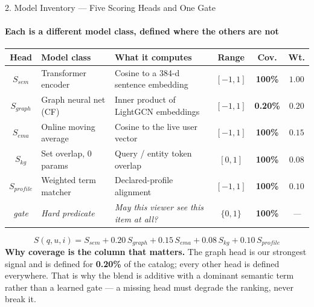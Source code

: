 \begin{frame}[shrink]{2. Model Inventory --- Five Scoring Heads and One Gate}
\framesubtitle{Each is a different model class, defined where the others are not}
\vspace{1mm}
\begin{center}
{\scriptsize
\renewcommand{\arraystretch}{1.22}
\begin{tabular}{c L{2.5cm} L{3.9cm} c c c}
\toprule
\textbf{Head} & \textbf{Model class} & \textbf{What it computes} & \textbf{Range} & \textbf{Cov.} & \textbf{Wt.}\\
\midrule
$S_{\mathit{sem}}$     & Transformer encoder   & Cosine to a 384-d sentence embedding & $[-1,1]$ & \textbf{100\%} & $1.00$\\
$S_{\mathit{graph}}$   & Graph neural net (CF) & Inner product of LightGCN embeddings & $[-1,1]$ & \textcolor{amritaMaroon}{\textbf{0.20\%}} & $0.20$\\
$S_{\mathit{ema}}$     & Online moving average & Cosine to the live user vector       & $[-1,1]$ & \textbf{100\%} & $0.15$\\
$S_{\mathit{kg}}$      & Set overlap, 0 params & Query / entity token overlap         & $[0,1]$  & \textbf{100\%} & $0.08$\\
$S_{\mathit{profile}}$ & Weighted term matcher & Declared-profile alignment           & $[-1,1]$ & \textbf{100\%} & $0.10$\\
\midrule
\textit{gate} & \textit{Hard predicate} & \textit{May this viewer see this item at all?} & $\{0,1\}$ & \textbf{100\%} & \textit{---}\\
\bottomrule
\end{tabular}}
\end{center}
\vspace{1mm}
{\scriptsize\eqs
\[ S(q,u,i) = S_{\mathit{sem}} + 0.20\,S_{\mathit{graph}} + 0.15\,S_{\mathit{ema}} + 0.08\,S_{\mathit{kg}} + 0.10\,S_{\mathit{profile}} \]}
\vspace{0.5mm}
{\scriptsize\eqs\textbf{Why coverage is the column that matters.} The graph head is our strongest signal
and is defined for \textbf{0.20\%} of the catalog; every other head is defined everywhere. That is
why the blend is additive with a dominant semantic term rather than a learned gate --- a missing
head must degrade the ranking, never break it.}
\end{frame}

